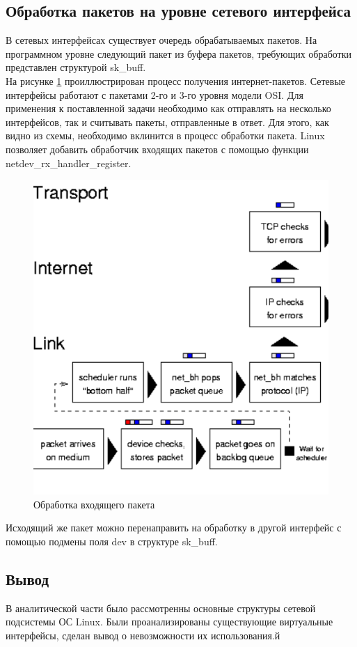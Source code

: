 \documentclass[14pt, a4paper]{extarticle}
\begin{document}
\subsection{Обработка пакетов на уровне сетевого интерфейса}
В сетевых интерфейсах существует очередь обрабатываемых пакетов.  На программном уровне следующий пакет из буфера пакетов, требующих обработки представлен структурой sk\_buff. \\
\indent На рисунке \ref{rx} проиллюстрирован процесс получения интернет-пакетов. Сетевые интерфейсы работают с пакетами 2-го и 3-го уровня модели OSI. Для применения к поставленной задачи необходимо как отправлять на несколько интерфейсов, так и считывать пакеты, отправленные в ответ. Для этого, как видно из схемы, необходимо вклинится в процесс обработки пакета. Linux позволяет добавить обработчик входящих пакетов с помощью функции netdev\_rx\_handler\_register.
\begin{figure}[H]
	\centering
	\includegraphics[scale=0.9]{r_rx.png}
	\caption{Обработка входящего пакета}
	\label{rx}
\end{figure}
\indent \indent Исходящий же пакет можно перенаправить на обработку в другой интерфейс с помощью подмены поля dev в структуре sk\_buff.

\subsection{Вывод}
В аналитической части было рассмотренны основные структуры сетевой подсистемы ОС Linux. Были проанализированы существующие виртуальные интерфейсы, сделан вывод о невозможности их использования.й
\clearpage
\end{document}
